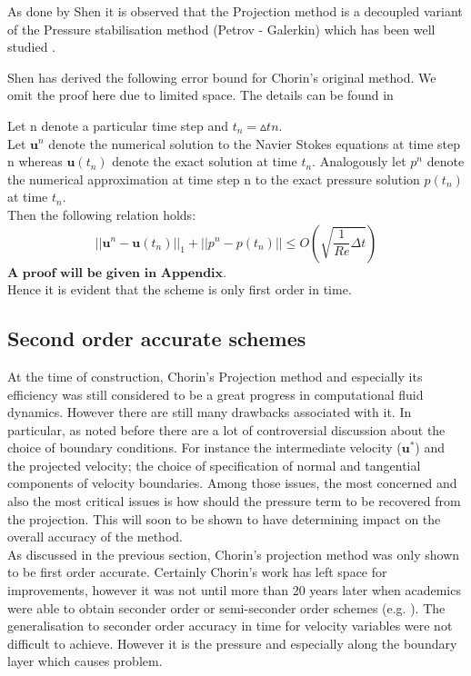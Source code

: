 As done by Shen it is observed that the Projection method is a decoupled variant of the Pressure stabilisation method (Petrov - Galerkin) which has been well studied \cite{shen1992error,rannacher1992chorin}.

Shen has derived the following error bound for Chorin's original method. We omit the proof here due to limited space. The details can be found in \cite{shen1992error}
\begin{theorem}
Let n denote a particular time step and $t_n = \vartriangle t n$.\\
Let $\textbf{u}^n$ denote the numerical solution to the Navier Stokes equations at time step n whereas $\textbf{u} (t_n)$ denote the exact solution at time $t_n$. Analogously let $\textit{p}^n$ denote the numerical approximation at time step n to the exact pressure solution $\textit{p} (t_n)$ at time $t_n$.\\
Then the following relation holds:
\begin{equation}
|| \textbf{u}^n - \textbf{u} (t_n)||_1 + || \textit{p}^n - \textit{p} (t_n)|| \leq O(\sqrt{\dfrac{1}{Re} \Delta t})
\end{equation}
$\textbf{A proof will be given in Appendix}$.\\
Hence it is evident that the scheme is only first order in time.
\end{theorem}

\subsection{Second order accurate schemes}

At the time of construction, Chorin's Projection method and especially its efficiency was still considered to be a great progress in computational fluid dynamics. However there are still many drawbacks associated with it. In particular, as noted before there are a lot of controversial discussion about the choice of boundary conditions. For instance the intermediate velocity ($\textbf{u}^*$) and the projected velocity; the choice of specification of normal and tangential components of velocity boundaries. Among those issues, the most concerned and also the most critical issues is how should the pressure term to be recovered from the projection. This will soon to be shown to have determining impact on the overall accuracy of the method.\\

As discussed in the previous section, Chorin's projection method was only shown to be first order accurate. Certainly Chorin's work has left space for improvements, however it was not until more than 20 years later when academics were able to obtain seconder order or semi-seconder order schemes (e.g. \cite{kim1985application,bell1989second}). The generalisation to seconder order accuracy in time for velocity variables were not difficult to achieve. However it is the pressure and especially along the boundary layer which causes problem. 

